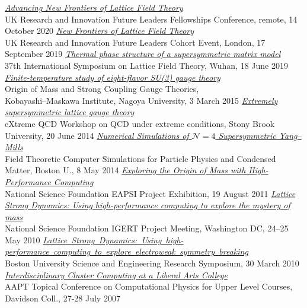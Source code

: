 \begin{spacelist}
\begin{revnumerate}
    \pagebreakitem
      \textit{\href{http://www.davidschaich.net/talks/2010UKRI.html}{Advancing New Frontiers of Lattice Field Theory}} \\
      UK Research and Innovation Future Leaders Fellowships Conference, remote, 14 October 2020
    \pagebreakitem
      \textit{\href{http://www.davidschaich.net/talks/1909UKRI.pdf}{New Frontiers of Lattice Field Theory}} \\
      UK Research and Innovation Future Leaders Cohort Event, London, 17 September 2019
    \pagebreakitem
      \textit{\href{http://www.davidschaich.net/talks/1906Lattice-poster.pdf}{Thermal phase structure of a supersymmetric matrix model}} \\
      37th International Symposium on Lattice Field Theory, Wuhan, 18 June 2019
    \pagebreakitem
      \textit{\href{http://www.davidschaich.net/talks/SCGTposter.pdf}{Finite-temperature study of eight-flavor SU(3) gauge theory}} \\
      Origin of Mass and Strong Coupling Gauge Theories, \\ Kobayashi--Maskawa Institute, Nagoya University, 3 March 2015
    \pagebreakitem
      \textit{\href{http://www.davidschaich.net/talks/XQCD14.pdf}{Extremely supersymmetric lattice gauge theory}} \\
      eXtreme QCD Workshop on QCD under extreme conditions, Stony Brook University, 20 June 2014
    \pagebreakitem
      \textit{\href{http://www.davidschaich.net/talks/PPCM14.pdf}{Numerical Simulations of $\mathcal N = 4$ Supersymmetric Yang--Mills}} \\
      Field Theoretic Computer Simulations for Particle Physics and Condensed Matter, Boston U., 8 May 2014
    \pagebreakitem
      \textit{\href{http://www.davidschaich.net/talks/SITposter.pdf}{Exploring the Origin of Mass with High-Performance Computing}} \\
      National Science Foundation EAPSI Project Exhibition, 19 August 2011
    \pagebreakitem
      \textit{\href{http://www.davidschaich.net/talks/IGERT.pdf}{Lattice Strong Dynamics: Using high-performance computing to explore the mystery of mass}} \\
      National Science Foundation IGERT Project Meeting, Washington DC, 24--25 May 2010
    \pagebreakitem
      \textit{\href{http://www.davidschaich.net/talks/BUsymposium.pdf}{Lattice~Strong~Dynamics:~Using~high-performance~computing~to~explore~electroweak~symmetry~breaking}} \\
      Boston University Science and Engineering Research Symposium, 30 March 2010
    \pagebreakitem
      \textit{\href{http://www.davidschaich.net/talks/AAPT07.pdf}{Interdisciplinary Cluster Computing at a Liberal Arts College}} \\
      AAPT Topical Conference on Computational Physics for Upper Level Courses, Davidson Coll., 27-28 July 2007
  \end{revnumerate}
\end{spacelist}
